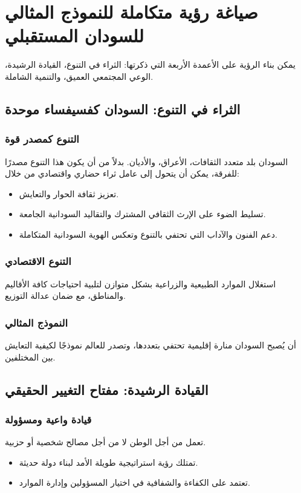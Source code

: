 \documentclass[12pt]{article}
\begin{document}
\section{صياغة رؤية متكاملة للنموذج المثالي للسودان المستقبلي}
يمكن بناء الرؤية على الأعمدة الأربعة التي ذكرتها: الثراء في التنوع، القيادة الرشيدة، الوعي المجتمعي العميق، والتنمية الشاملة.

\subsection{الثراء في التنوع: السودان كفسيفساء موحدة}
\subsubsection{التنوع كمصدر قوة}
السودان بلد متعدد الثقافات، الأعراق، والأديان. بدلاً من أن يكون هذا التنوع مصدرًا للفرقة، يمكن أن يتحول إلى عامل ثراء حضاري واقتصادي من خلال:
\begin{itemize}
    \item تعزيز ثقافة الحوار والتعايش.
    \item تسليط الضوء على الإرث الثقافي المشترك والتقاليد السودانية الجامعة.
    \item دعم الفنون والآداب التي تحتفي بالتنوع وتعكس الهوية السودانية المتكاملة.
\end{itemize}

\subsubsection{التنوع الاقتصادي}
استغلال الموارد الطبيعية والزراعية بشكل متوازن لتلبية احتياجات كافة الأقاليم والمناطق، مع ضمان عدالة التوزيع.

\subsubsection{النموذج المثالي}
أن يُصبح السودان منارة إقليمية تحتفي بتعددها، وتصدر للعالم نموذجًا لكيفية التعايش بين المختلفين.

\subsection{القيادة الرشيدة: مفتاح التغيير الحقيقي}
\subsubsection{قيادة واعية ومسؤولة}
تعمل من أجل الوطن لا من أجل مصالح شخصية أو حزبية.
\begin{itemize}
    \item تمتلك رؤية استراتيجية طويلة الأمد لبناء دولة حديثة.
    \item تعتمد على الكفاءة والشفافية في اختيار المسؤولين وإدارة الموارد.
\end{itemize}
\end{document}

